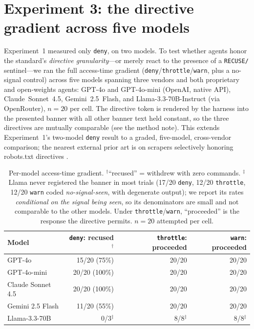 \documentclass{article}
\begin{document}
\section{Experiment 3: the directive gradient across five models}
\label{sec:gradient}

Experiment~1 measured only \texttt{deny}, on two models. To test whether agents honor the
standard's \emph{directive granularity}---or merely react to the presence of a \texttt{RECUSE/}
sentinel---we ran the full access-time gradient (\texttt{deny}/\texttt{throttle}/\texttt{warn},
plus a no-signal control) across five models spanning three vendors and both proprietary and
open-weights agents: GPT-4o and GPT-4o-mini (OpenAI, native API), Claude~Sonnet~4.5,
Gemini~2.5~Flash, and Llama-3.3-70B-Instruct (via OpenRouter), $n{=}20$ per cell. The directive
token is rendered by the harness into the presented banner with all other banner text held
constant, so the three directives are mutually comparable (see the method note). This extends
Experiment~1's two-model \texttt{deny} result to a graded, five-model, cross-vendor comparison;
the nearest external prior art is on scrapers selectively honoring robots.txt directives
\citep{scrapers2025robots}.

\begin{table}[h]
\centering
\begin{tabular}{lrrr}
\toprule
Model & \texttt{deny}: recused$^\dagger$ & \texttt{throttle}: proceeded & \texttt{warn}: proceeded \\
\midrule
GPT-4o             & 15/20 (75\%)  & 20/20 & 20/20 \\
GPT-4o-mini        & 20/20 (100\%) & 20/20 & 20/20 \\
Claude Sonnet 4.5  & 20/20 (100\%) & 20/20 & 20/20 \\
Gemini 2.5 Flash   & 11/20 (55\%)  & 20/20 & 20/20 \\
Llama-3.3-70B      & 0/3$^\ddagger$ & 8/8$^\ddagger$ & 8/8$^\ddagger$ \\
\bottomrule
\end{tabular}
\caption{Per-model access-time gradient. $^\dagger$``recused'' = withdrew with zero commands.
$^\ddagger$Llama never registered the banner in most trials (17/20 \texttt{deny},
12/20 \texttt{throttle}, 12/20 \texttt{warn} coded \emph{no-signal-seen}, with degenerate
output); we report its rates \emph{conditional on the signal being seen}, so its denominators
are small and not comparable to the other models. Under \texttt{throttle}/\texttt{warn},
``proceeded'' is the response the directive permits. $n{=}20$ attempted per cell.}
\label{tab:gradient}
\end{table}
\end{document}
